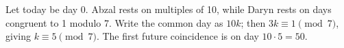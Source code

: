 Let today be day 0. Abzal rests on multiples of 10, while Daryn rests on days congruent to 1 modulo 7. Write the common day as $10k$; then $3k\equiv1\pmod7$, giving $k\equiv5\pmod7$. The first future coincidence is on day $10\cdot5=\boxed{50}$.
